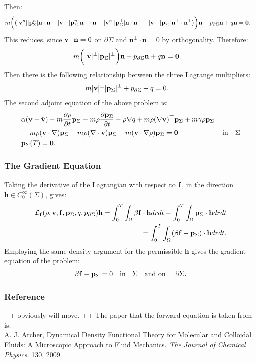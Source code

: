 Then:
\begin{align*}
&m \bigg((|\mathbf{v}^n||\mathbf{p}_\Sigma^n|\mathbf{n} \cdot \mathbf{n} + |\mathbf{v}^\perp||\mathbf{p}_\Sigma^n|\mathbf{n}^\perp \cdot \mathbf{n} + |\mathbf{v}^n||\mathbf{p}_\Sigma^\perp|\mathbf{n} \cdot\mathbf{n}^\perp+|\mathbf{v}^\perp||\mathbf{p}_\Sigma^\perp|\mathbf{n}^\perp \cdot \mathbf{n}^\perp)\bigg)\mathbf{n}+  p_{\partial \Sigma}\mathbf{n} + q \mathbf{n} =\mathbf{0}.
\end{align*}
This reduces, since $\mathbf{v} \cdot \mathbf{n}=0$ on $\partial \Sigma$  and $\mathbf{n}^\perp \cdot \mathbf{n}=0$ by orthogonality. Therefore:
\begin{align*}
&m \bigg(|\mathbf{v}|^\perp|\mathbf{p}_\Sigma|^\perp\bigg)\mathbf{n}+  p_{\partial \Sigma}\mathbf{n} + q \mathbf{n} =\mathbf{0}.
\end{align*}
Then there is the following relationship between the three Lagrange multipliers:
\begin{align*}
&m |\mathbf{v}|^\perp|\mathbf{p}_\Sigma|^\perp+  p_{\partial \Sigma} + q  =0.
\end{align*}
The second adjoint equation of the above problem is:
\begin{align*}
&\alpha(\Stav - \hat \Stav)   - m \frac{\partial \Sta}{\partial t} \Adja  -  m\Sta \frac{\partial \Adja}{\partial t} 
-\Sta\nabla \Adjb +m \Sta (\nabla \Stav)^\top \Adja +m \gamma \Sta \Adja \\
&-m \Sta (\Stav \cdot \nabla)\Adja - m \Sta (\nabla \cdot \Stav)\Adja  - m (\Stav \cdot \nabla \Sta)\Adja=\mathbf{0} \ \qquad\qquad \qquad\text{in} \quad \Sigma\\
&\Adja(T)=\mathbf{0}.
\end{align*}

\subsubsection*{The Gradient Equation}
Taking the derivative of the Lagrangian with respect to $\mathbf{f}$, in the direction $\mathbf{h} \in C_0^\infty(\Sigma)$, gives:
\begin{align*}
\mathcal{L}_{\mathbf{f}} (\rho,\mathbf{v},\mathbf{f},\mathbf{p}_\Sigma,q,p_{\partial \Sigma}) \mathbf{h}= \int_0^T \int_\Omega \beta \mathbf{f} \cdot \mathbf{h} dr dt - \int_0^T \int_\Omega \mathbf{p}_\Sigma \cdot \mathbf{h} dr dt \\
= \int_0^T \int_\Omega ( \beta \mathbf{f} - \mathbf{p}_\Sigma) \cdot \mathbf{h} dr dt.
\end{align*}
Employing the same density argument for the permissible $\mathbf{h}$ gives the gradient equation of the problem:
\begin{align*}
 \beta \mathbf{f} - \mathbf{p}_\Sigma=0 \quad \text{in} \quad \Sigma \quad \text{and on } \quad \partial\Sigma.
\end{align*}


\subsubsection*{Reference}
++ obviously will move. ++
The paper that the forward equation is taken from is:\\

A. J. Archer, Dynamical Density Functional Theory for Molecular and Colloidal Fluids: A Microscopic Approach to Fluid Mechanics. \textit{The Journal of Chemical Physics}. 130, 2009.
